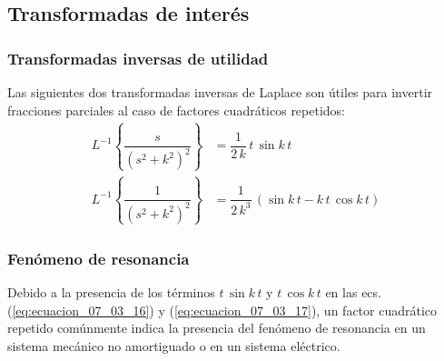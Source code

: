 \subsection{Transformadas de interés}
\begin{frame}
\frametitle{Transformadas inversas de utilidad}
Las siguientes dos transformadas inversas de Laplace son útiles para invertir fracciones parciales al caso de factores cuadráticos repetidos:
\begin{align}
L^{-1} \left\{ \dfrac{s}{(s^{2} + k^{2})^{2}} \right\} &= \dfrac{1}{2 \, k} \, t \, \sin k \, t \label{eq:ecuacion_07_03_16} \\[0.5em]
L^{-1} \left\{ \dfrac{1}{(s^{2} + k^{2})^{2}} \right\} &= \dfrac{1}{2 \, k^{3}} \, (\sin k \, t - k \, t \, \cos k \, t) \label{eq:ecuacion_07_03_17}
\end{align}
\end{frame}
\begin{frame}
\frametitle{Fenómeno de resonancia}
Debido a la presencia de los términos $t \, \sin k \, t$ y $t \, \cos k \, t$ en las ecs. (\ref{eq:ecuacion_07_03_16}) y (\ref{eq:ecuacion_07_03_17}), un factor cuadrático repetido comúnmente indica la presencia del fenómeno de resonancia en un sistema mecánico no amortiguado o en un sistema eléctrico.
\end{frame}
